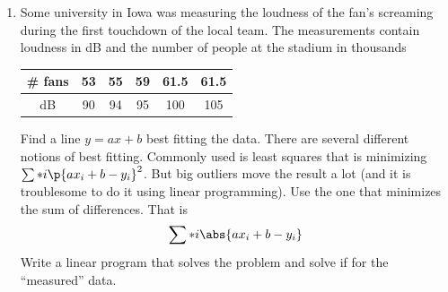 \documentclass[11pt, oneside]{article}
\begin{document}
\begin{enumerate}
\begin{proof}
            This shows that $A\v{x} \le \v{b}$ has a nonnegative solution
            if and only if for all $\v{y} \in \RR^m$ such that
            $\v{y}^T C \ge \v{0}^T$ and $\v{y}^T \ge \v{0}^T$ then
            $\v{y}^T \v{b} \ge 0$.
        \end{proof}

    \item %
        Some university in Iowa was measuring the loudness of the fan's
        screaming during the first touchdown of the local team.
        The measurements contain loudness in dB and the number of people at the
        stadium in thousands
        \begin{center}
            \begin{tabular}{*{6}c}
                \toprule
                \# fans & 53 & 55 & 59 & 61.5 & 61.5 \\
                \midrule
                dB     & 90 & 94 & 95 &  100 &  105 \\
                \bottomrule
            \end{tabular}
        \end{center}
        Find a line $y = ax + b$ best fitting the data.
        There are several different notions of best fitting.
        Commonly used is least squares that is minimizing $\sum*{i}{}{\p{ax_i + b - y_i}^2}$.
        But big outliers move the result a lot (and it is troublesome to do it
        using linear programming).
        Use the one that minimizes the sum of differences. That is
        \[
            \sum*{i}{}{\abs{a x_i + b - y_i}}
        \]
        Write a linear program that solves the problem and solve if for the
        ``measured'' data.


\end{enumerate}
\end{document}

